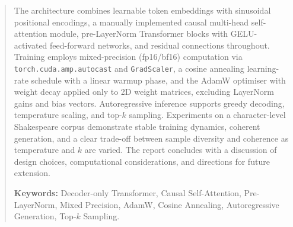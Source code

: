 \begin{abstract}
\noindent
The architecture combines learnable token embeddings with sinusoidal 
positional encodings, a manually implemented causal multi-head self-attention 
module, pre-LayerNorm Transformer blocks with GELU-activated feed-forward 
networks, and residual connections throughout. Training employs mixed-precision 
(fp16/bf16) computation via \texttt{torch.cuda.amp.autocast} and 
\texttt{GradScaler}, a cosine annealing learning-rate schedule with a linear 
warmup phase, and the AdamW optimiser with weight decay applied only to 
2D weight matrices, excluding LayerNorm gains and bias vectors. Autoregressive 
inference supports greedy decoding, temperature scaling, and top-$k$ sampling. 
Experiments on a character-level Shakespeare corpus demonstrate stable training 
dynamics, coherent generation, and a clear trade-off between sample diversity 
and coherence as temperature and $k$ are varied. The report concludes with a 
discussion of design choices, computational considerations, and directions 
for future extension.

\vspace{0.5em}
\noindent\textbf{Keywords:} Decoder-only Transformer, Causal Self-Attention, 
Pre-LayerNorm, Mixed Precision, AdamW, Cosine Annealing, Autoregressive 
Generation, Top-$k$ Sampling.
\end{abstract}